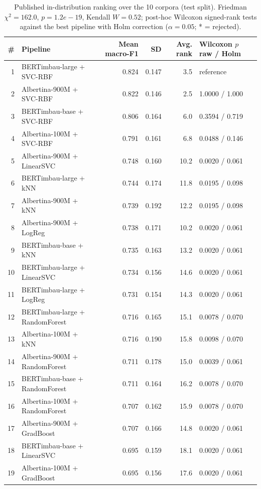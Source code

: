 \begin{table}[t]
\centering
\scriptsize
\caption{Published in-distribution ranking over the 10 corpora (test split). Friedman $\chi^2 = 162.0$, $p = 1.2e-19$, Kendall $W = 0.52$; post-hoc Wilcoxon signed-rank tests against the best pipeline with Holm correction ($\alpha = 0.05$; * = rejected).}
\label{tab:b-friedman}
\begin{tabular}{rlrrrl}
\toprule
\# & Pipeline & Mean macro-F1 & SD & Avg. rank & Wilcoxon $p$ raw / Holm \\
\midrule
1 & BERTimbau-large + SVC-RBF & 0.824 & 0.147 & 3.5 & reference \\
2 & Albertina-900M + SVC-RBF & 0.822 & 0.146 & 2.5 & 1.0000 / 1.000 \\
3 & BERTimbau-base + SVC-RBF & 0.806 & 0.164 & 6.0 & 0.3594 / 0.719 \\
4 & Albertina-100M + SVC-RBF & 0.791 & 0.161 & 6.8 & 0.0488 / 0.146 \\
5 & Albertina-900M + LinearSVC & 0.748 & 0.160 & 10.2 & 0.0020 / 0.061 \\
6 & BERTimbau-large + kNN & 0.744 & 0.174 & 11.8 & 0.0195 / 0.098 \\
7 & Albertina-900M + kNN & 0.739 & 0.192 & 12.2 & 0.0195 / 0.098 \\
8 & Albertina-900M + LogReg & 0.738 & 0.171 & 10.2 & 0.0020 / 0.061 \\
9 & BERTimbau-base + kNN & 0.735 & 0.163 & 13.2 & 0.0020 / 0.061 \\
10 & BERTimbau-large + LinearSVC & 0.734 & 0.156 & 14.6 & 0.0020 / 0.061 \\
11 & BERTimbau-large + LogReg & 0.731 & 0.154 & 14.3 & 0.0020 / 0.061 \\
12 & BERTimbau-large + RandomForest & 0.716 & 0.165 & 15.1 & 0.0078 / 0.070 \\
13 & Albertina-100M + kNN & 0.716 & 0.190 & 15.8 & 0.0098 / 0.070 \\
14 & Albertina-900M + RandomForest & 0.711 & 0.178 & 15.0 & 0.0039 / 0.061 \\
15 & BERTimbau-base + RandomForest & 0.711 & 0.164 & 16.2 & 0.0078 / 0.070 \\
16 & Albertina-100M + RandomForest & 0.707 & 0.162 & 15.9 & 0.0078 / 0.070 \\
17 & Albertina-900M + GradBoost & 0.707 & 0.166 & 14.8 & 0.0020 / 0.061 \\
18 & BERTimbau-base + LinearSVC & 0.695 & 0.159 & 18.1 & 0.0020 / 0.061 \\
19 & Albertina-100M + GradBoost & 0.695 & 0.156 & 17.6 & 0.0020 / 0.061 \\

\end{tabular}
\end{table}
